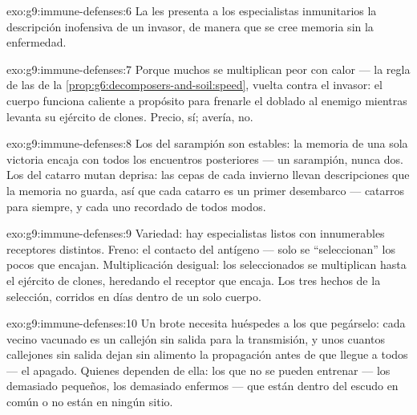\begin{solution}{exo:g9:immune-defenses:6}
La  les presenta a los especialistas inmunitarios la
descripción inofensiva de un invasor, de manera que se cree memoria sin
la enfermedad.
\end{solution}

\begin{solution}{exo:g9:immune-defenses:7}
Porque muchos  se multiplican peor con calor --- la regla de
las  de la \cref{prop:g6:decomposers-and-soil:speed}, vuelta
contra el invasor: el cuerpo funciona caliente a propósito para
frenarle el doblado al enemigo mientras levanta su ejército de clones.
Precio, sí; avería, no.
\end{solution}

\begin{solution}{exo:g9:immune-defenses:8}
Los  del sarampión son estables: la memoria de una sola
victoria encaja con todos los encuentros posteriores --- un sarampión,
nunca dos. Los  del catarro mutan deprisa: las cepas de cada
invierno llevan descripciones que la memoria no guarda, así que cada
catarro es un primer desembarco --- catarros para siempre, y cada uno
recordado de todos modos.
\end{solution}

\begin{solution}{exo:g9:immune-defenses:9}
Variedad: hay especialistas listos con innumerables receptores
distintos. Freno: el contacto del antígeno --- solo se ``seleccionan''
los pocos que encajan. Multiplicación desigual: los seleccionados se
multiplican hasta el ejército de clones, heredando el receptor que
encaja. Los tres hechos de la selección, corridos en días dentro de un
solo cuerpo.
\end{solution}

\begin{solution}{exo:g9:immune-defenses:10}
Un brote necesita huéspedes a los que pegárselo: cada vecino vacunado
es un callejón sin salida para la transmisión, y unos cuantos
callejones sin salida dejan sin alimento la propagación antes de que
llegue a todos --- el apagado. Quienes dependen de ella: los que no se
pueden entrenar --- los demasiado pequeños, los demasiado enfermos ---
que están dentro del escudo en común o no están en ningún sitio.
\end{solution}

